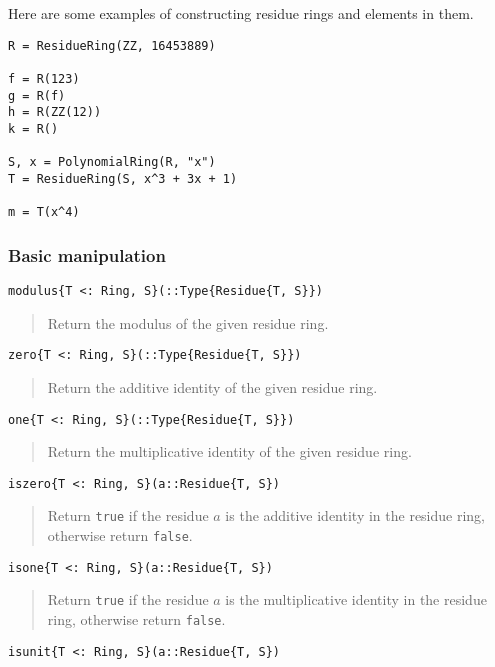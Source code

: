 \documentclass[a4paper,10pt]{article}
\newcommand{\code}{\lstinline}
\newcommand{\desc}[1]{\vspace{-3mm}\begin{quote}#1\end{quote}}
\begin{document}
{{Here are some examples of constructing residue rings and elements in them.

\begin{lstlisting}
R = ResidueRing(ZZ, 16453889)

f = R(123)
g = R(f)
h = R(ZZ(12))
k = R()

S, x = PolynomialRing(R, "x")
T = ResidueRing(S, x^3 + 3x + 1)

m = T(x^4)
\end{lstlisting}

\subsubsection{Basic manipulation}

\begin{lstlisting}
modulus{T <: Ring, S}(::Type{Residue{T, S}})
\end{lstlisting}

\desc{Return the modulus of the given residue ring.}

\begin{lstlisting}
zero{T <: Ring, S}(::Type{Residue{T, S}})
\end{lstlisting}

\desc{Return the additive identity of the given residue ring.}

\begin{lstlisting}
one{T <: Ring, S}(::Type{Residue{T, S}})
\end{lstlisting}

\desc{Return the multiplicative identity of the given residue ring.}

\begin{lstlisting}
iszero{T <: Ring, S}(a::Residue{T, S})
\end{lstlisting}

\desc{Return \code{true} if the residue $a$ is the additive identity in the
residue ring, otherwise return \code{false}.}

\begin{lstlisting}
isone{T <: Ring, S}(a::Residue{T, S})
\end{lstlisting}

\desc{Return \code{true} if the residue $a$ is the multiplicative identity in
the residue ring, otherwise return \code{false}.}

\begin{lstlisting}
isunit{T <: Ring, S}(a::Residue{T, S})
\end{lstlisting}

}}
\end{document}
